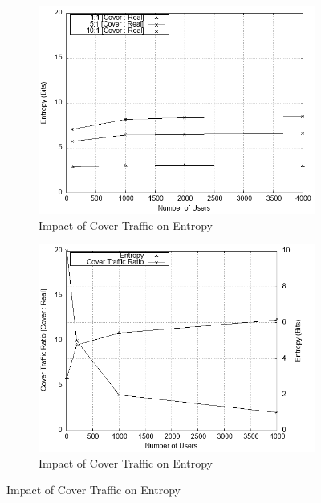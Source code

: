 \documentclass[logo,msc,cyber]{infthesis}   %
\begin{document}
\begin{figure}[h!]
    \centering
    \begin{subfigure}[b]{0.45\textwidth}
        \centering
        \includegraphics[width=\textwidth]{figures/simulator/3.png}
        \caption{Impact of Cover Traffic on Entropy}
        \label{fig:cover-traffic-ratios}
    \end{subfigure}
    \hfill
    \begin{subfigure}[b]{0.45\textwidth}
        \centering
        \includegraphics[width=\textwidth]{figures/simulator/4.png}
        \caption{Impact of Cover Traffic on Entropy}
        \label{fig:cover-traffic-decreasing-ratios}
    \end{subfigure}
 \end{figure}
\end{document}
